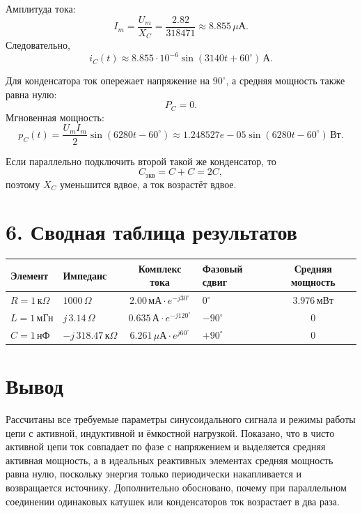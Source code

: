 \documentclass[12pt,a4paper]{article}
\begin{document}
Амплитуда тока:
\[
I_m=\frac{U_m}{X_C}=\frac{2.82}{318471}
\approx 8.855\,\mu\text{А}.
\]
Следовательно,
\[
i_C(t)\approx 8.855\cdot 10^{-6}\sin(3140t+60^\circ)\,\text{А}.
\]

Для конденсатора ток опережает напряжение на $90^\circ$, а средняя мощность также равна нулю:
\[
  P_C=0.
\]
Мгновенная мощность:
\[
p_C(t)= \frac{U_mI_m}2\sin(6280t-60^\circ)
\approx 1.248527e-05\sin(6280t-60^\circ)\,\text{Вт}.
\]

Если параллельно подключить второй такой же конденсатор, то
\[
C_{\text{экв}}=C+C=2C,
\]
поэтому $X_C$ уменьшится вдвое, а ток возрастёт вдвое.

\section*{6. Сводная таблица результатов}
\begin{center}
\begin{tabularx}{\textwidth}{|p{2.0cm}|p{2.5cm}|C|p{2.8cm}|C|}
\hline
Элемент & \centering Импеданс & Комплекс тока & \centering Фазовый сдвиг & Средняя мощность \\
\hline
$R=1\,\text{к}\Omega$ &
\centering $1000\,\Omega$ &
$2.00\,\text{мА}\cdot e^{-j30^\circ}$ &
\centering $0^\circ$ &
$3.976\,\text{мВт}$ \\
\hline
$L=1\,\text{мГн}$ &
\centering $j\,3.14\,\Omega$ &
$0.635\,\text{А}\cdot e^{-j120^\circ}$ &
\centering $-90^\circ$ &
$0$ \\
\hline
$C=1\,\text{нФ}$ &
\centering $-j\,318.47\,\text{к}\Omega$ &
$6.261\,\mu\text{А}\cdot e^{j60^\circ}$ &
\centering $+90^\circ$ &
$0$ \\
\hline
\end{tabularx}
\end{center}

\section*{Вывод}
Рассчитаны все требуемые параметры синусоидального сигнала и режимы работы 
цепи с активной, индуктивной и ёмкостной нагрузкой. Показано, что в чисто активной цепи 
ток совпадает по фазе с напряжением и выделяется средняя активная мощность, а в идеальных 
реактивных элементах средняя мощность равна нулю, поскольку энергия только периодически 
накапливается и возвращается источнику. Дополнительно обосновано, почему при параллельном 
соединении одинаковых катушек или конденсаторов ток возрастает в два раза.
\end{document}
